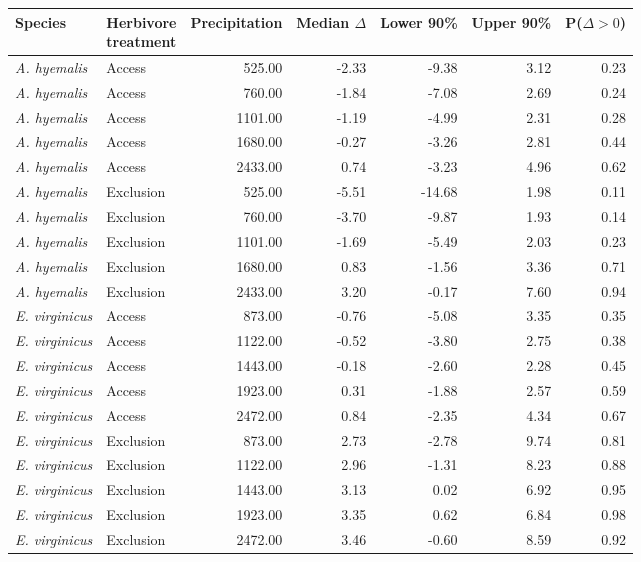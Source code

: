 \begin{tabular}{llrrrrr}
  \hline
Species & \makecell{Herbivore \\ treatment} & Precipitation & Median $\Delta$ & Lower 90\% & Upper 90\% & P($\Delta>0$) \\ 
  \hline
\textit{A. hyemalis} & Access & 525.00 & -2.33 & -9.38 & 3.12 & 0.23 \\ 
  \textit{A. hyemalis} & Access & 760.00 & -1.84 & -7.08 & 2.69 & 0.24 \\ 
  \textit{A. hyemalis} & Access & 1101.00 & -1.19 & -4.99 & 2.31 & 0.28 \\ 
  \textit{A. hyemalis} & Access & 1680.00 & -0.27 & -3.26 & 2.81 & 0.44 \\ 
  \textit{A. hyemalis} & Access & 2433.00 & 0.74 & -3.23 & 4.96 & 0.62 \\ 
  \textit{A. hyemalis} & Exclusion & 525.00 & -5.51 & -14.68 & 1.98 & 0.11 \\ 
  \textit{A. hyemalis} & Exclusion & 760.00 & -3.70 & -9.87 & 1.93 & 0.14 \\ 
  \textit{A. hyemalis} & Exclusion & 1101.00 & -1.69 & -5.49 & 2.03 & 0.23 \\ 
  \textit{A. hyemalis} & Exclusion & 1680.00 & 0.83 & -1.56 & 3.36 & 0.71 \\ 
  \textit{A. hyemalis} & Exclusion & 2433.00 & 3.20 & -0.17 & 7.60 & 0.94 \\ 
  \textit{E. virginicus} & Access & 873.00 & -0.76 & -5.08 & 3.35 & 0.35 \\ 
  \textit{E. virginicus} & Access & 1122.00 & -0.52 & -3.80 & 2.75 & 0.38 \\ 
  \textit{E. virginicus} & Access & 1443.00 & -0.18 & -2.60 & 2.28 & 0.45 \\ 
  \textit{E. virginicus} & Access & 1923.00 & 0.31 & -1.88 & 2.57 & 0.59 \\ 
  \textit{E. virginicus} & Access & 2472.00 & 0.84 & -2.35 & 4.34 & 0.67 \\ 
  \textit{E. virginicus} & Exclusion & 873.00 & 2.73 & -2.78 & 9.74 & 0.81 \\ 
  \textit{E. virginicus} & Exclusion & 1122.00 & 2.96 & -1.31 & 8.23 & 0.88 \\ 
  \textit{E. virginicus} & Exclusion & 1443.00 & 3.13 & 0.02 & 6.92 & 0.95 \\ 
  \textit{E. virginicus} & Exclusion & 1923.00 & 3.35 & 0.62 & 6.84 & 0.98 \\ 
  \textit{E. virginicus} & Exclusion & 2472.00 & 3.46 & -0.60 & 8.59 & 0.92 \\ 
   \hline
\end{tabular}